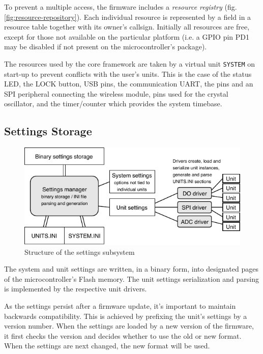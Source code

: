 To prevent a multiple access, the firmware includes a \textit{resource registry} (fig. \ref{fig:resource-repository}). Each individual resource is represented by a field in a resource table together with its owner's callsign. Initially all resources are free, except for those not available on the particular platform (i.e. a GPIO pin PD1 may be disabled if not present on the microcontroller's package).

The resources used by the core framework are taken by a virtual unit \verb|SYSTEM| on start-up to prevent conflicts with the user's units. This is the case of the status \gls{LED}, the LOCK button, \gls{USB} pins, the communication \gls{UART}, the pins and an \gls{SPI} peripheral connecting the wireless module, pins used for the crystal oscillator, and the timer/counter which provides the system timebase.


\subsection{Settings Storage} \label{sec:settings-storage}

\begin{figure}[h]
	\centering
	\includegraphics[scale=1] {img/settings-storage.pdf}
	\caption{\label{fig:settings-storage}Structure of the settings subsystem}
\end{figure}

The system and unit settings are written, in a binary form, into designated pages of the microcontroller's Flash memory. The unit settings serialization and parsing is implemented by the respective unit drivers.

As the settings persist after a firmware update, it's important to maintain backwards compatibility. This is achieved by prefixing the unit's settings by a version number. When the settings are loaded by a new version of the firmware, it first checks the version and decides whether to use the old or new format. When the settings are next changed, the new format will be used.

